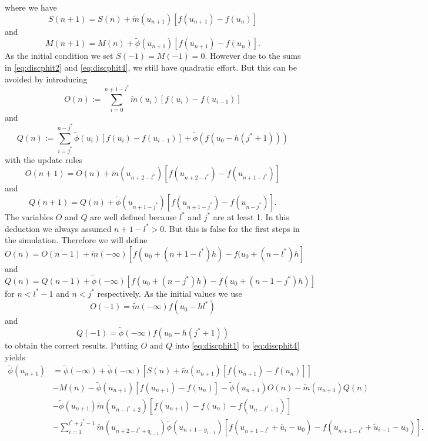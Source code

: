\documentclass[12pt,a4paper,twoside, open=right]{scrreprt}
\theoremstyle{definition}
\theoremstyle{plain}
\begin{document}
where we have
\begin{equation}
    S(n+1) = S(n)+\tilde{m}(u_{n+1})[f(u_{n+1})-f(u_n)]
\end{equation}
and 
\begin{equation}
    M(n+1) = M(n) + \tilde\phi(u_{n+1})[f(u_{n+1})-f(u_{n})].
\end{equation}
As the initial condition we set $S(-1)=M(-1)=0$. However due to the sums in \eqref{eq:discphit2} and \eqref{eq:discphit4}, we still have quadratic effort. But this can be avoided by introducing 
\begin{equation}
    O(n):=\sum_{i=0}^{n+1-l^*}\tilde{m}(u_i)[f(u_i)-f(u_{i-1})]
\end{equation}
and 
\begin{equation}
    Q(n):=\sum_{i=j^*}^{n-j^*}\tilde\phi(u_{i})[f(u_i)-f(u_{i-1})]+\tilde\phi(f(u_0-h(j^*+1)))
\end{equation}
with the update rules
\begin{equation}
O(n+1) = O(n)+\tilde{m}(u_{n+2-l^*})[f(u_{n+2-l^*})-f(u_{n+1-l^*})]
\end{equation}
and 
\begin{equation}
Q(n+1) = Q(n) + \tilde\phi(u_{n+1-j^*})[f(u_{n+1-j^*})-f(u_{n-j^*})].
\end{equation}
The variables $O$ and $Q$ are well defined because $l^*$ and $j^*$ are at least 1. In this deduction we always assumed $n+1-l^*>0$. But this is false for the first steps in the simulation. Therefore we will define
\begin{equation}
    O(n)= O(n-1)+\tilde{m}(-\infty)[f(u_0+(n+1-l^*)h)-f(u_0+(n-l^*)h]
\end{equation}
and 
\begin{equation}
Q(n)= Q(n-1)+\tilde{\phi}(-\infty)[f(u_0+(n-j^*)h)-f(u_0+(n-1-j^*)h)]
\end{equation}
for $n<l^*-1$ and $n<j^*$ respectively. As the initial values we use 
\begin{equation}
    O(-1) = \tilde{m}(-\infty)f(u_0-hl^*)
\end{equation}
and
\begin{equation}
    Q(-1) = \tilde{\phi}(-\infty)f(u_0-h(j^*+1))
\end{equation}
to obtain the correct results.
Putting $O$ and $Q$ into \eqref{eq:discphit1} to \eqref{eq:discphit4} yields
\begin{align}
    \tilde\phi(u_{n+1})&=\tilde\phi(-\infty) +\tilde\phi(-\infty)[S(n)+\tilde{m}(u_{n+1})[f(u_{n+1})-f(u_n)]]\\&-M(n) -\tilde\phi(u_{n+1})[f(u_{n+1})-f(u_{n})] -\tilde{\phi}(u_{n+1})O(n)-\tilde{m}(u_{n+1})Q(n)\\&-\tilde\phi(u_{n+1})\tilde{m}(u_{n-l^*+2})[f(u_{n+1})-f(u_n)-f(u_{n-l^*+1})] \\&-\sum_{i=1}^{l^*+j^*-1}\tilde{m}(u_{n+2-l^*+q_{i-1}})\tilde{\phi}(u_{n+1-y_{i-1}})[f(u_{n+1-l^*}+\tilde{u_i}-u_0)-f(u_{n+1-l^*}+\tilde{u}_{i-1}-u_0)].
\end{align}
\end{document}
